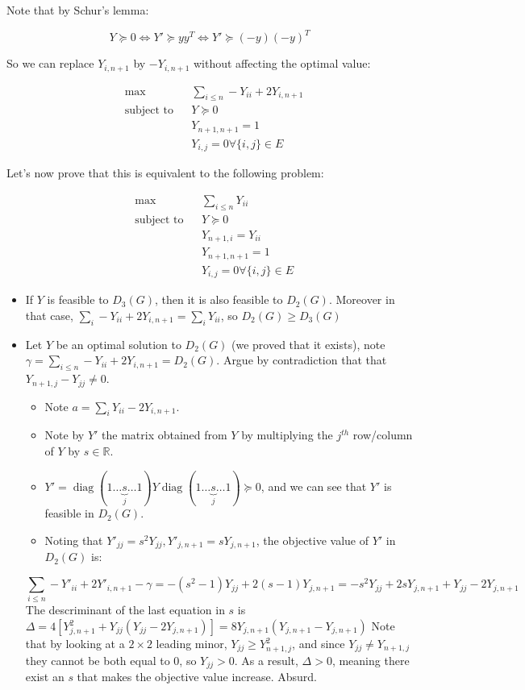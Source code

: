 \documentclass[11pt]{article}
\begin{document}
Note that by Schur's lemma:

$$Y \succeq 0 \iff Y' \succeq yy^T \iff Y' \succeq (-y)(-y)^T$$

So we can replace \(Y_{i, n+1}\) by \(-Y_{i, n+1}\) without affecting the optimal value:

\begin{align*}
\tag{$D_2(G)$}
& \max
& & \sum_{i \le n} - Y_{ii} + 2 Y_{i, n+1}\\
& \text{subject to}
& & Y \succeq 0
\\&&& Y_{n+1, n+1} = 1
\\&&& Y_{i,j} = 0 \forall \{i, j\} \in  E
\end{align*}


Let's now prove that this is equivalent to the following problem:


\begin{align*}
\tag{$D_3(G)$}
& \max
& & \sum_{i \le n}  Y_{ii} \\
& \text{subject to}
& & Y \succeq 0
\\& & &Y_{n+1, i} = Y_{ii} 
\\&&& Y_{n+1, n+1} = 1
\\&&& Y_{i,j} = 0 \forall \{i, j\} \in  E
\end{align*}

\begin{itemize}
\item If \(Y\) is feasible to \(D_3(G)\), then it is also feasible to \(D_2(G)\). Moreover in that case, \(\sum_{i} -Y_{ii} + 2Y_{i,n+1} =\sum_{i} Y_{ii}\), so \(D_2(G) \ge D_3(G)\)
\item Let \(Y\) be an optimal solution to \(D_2(G)\) (we proved that it exists), note \(\gamma = \sum_{i\le n} -Y_{ii} + 2 Y_{i, n+1} = D_2(G)\). Argue by contradiction that that \(Y_{n+1, j} - Y_{jj} \ne 0\).
\begin{itemize}
\item Note \(a = \sum_i Y_{ii} - 2Y_{i, n+1}\).

\item Note by \(Y'\) the matrix obtained from \(Y\) by multiplying the \(j^{th}\) row/column of \(Y\) by \(s \in \mathbb R\).
\item \(Y' = \operatorname{diag}(1 \ldots \underbrace{s}_j \ldots 1) Y  \operatorname{diag}(1 \ldots \underbrace{s}_j \ldots 1) \succeq 0\), and we can see that \(Y'\) is feasible in \(D_2(G)\).
\item Noting that \(Y'_{jj} = s^2 Y_{jj}, Y'_{j, n+1} = sY_{j, n+1}\), the objective value of \(Y'\) in \(D_2(G)\) is:
\end{itemize}
$$\sum_{i \le n} - Y'_{ii} + 2Y'_{i, n+1} - \gamma = - (s^2-1)  Y_{jj} + 2 (s-1) Y_{j, n+1} = -s^2 Y_{jj} + 2sY_{j, n+1} + Y_{jj}-2Y_{j, n+1}$$
The descriminant of the last equation in \(s\) is \(\Delta = 4[Y_{j, n+1}^2 + Y_{jj} (Y_{jj}-2Y_{j, n+1})] = 8Y_{j, n+1}(Y_{j, n+1} - Y_{j, n+1})\)
Note that by looking at a \(2 \times 2\) leading minor, \(Y_{jj} \ge Y_{n+1, j}^2\), and since \(Y_{jj} \ne Y_{n+1, j}\) they cannot be both equal to 0, so \(Y_{jj} > 0\). As a result, \(\Delta > 0\), meaning there exist an \(s\) that makes the objective value increase. 
Absurd.
\end{itemize}
\end{document}
